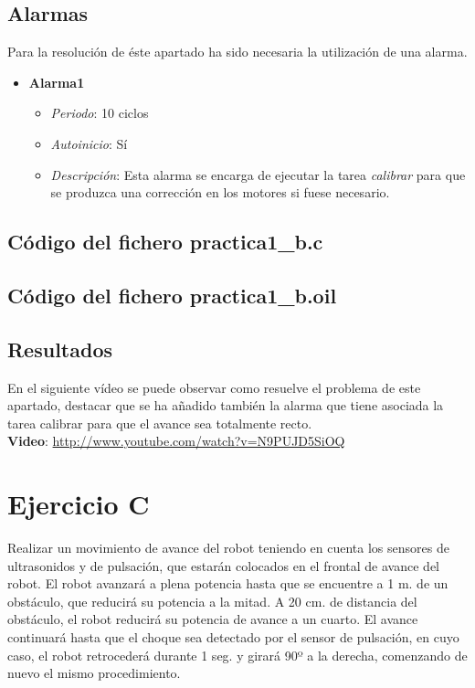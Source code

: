 \subsection{Alarmas}
Para la resolución de éste apartado ha sido necesaria la utilización de una alarma.

\begin{itemize}
	\item \textbf{Alarma1}
		\begin{itemize}
			\item \textit{Periodo}: 10 ciclos
			\item \textit{Autoinicio}: Sí
			\item \textit{Descripción}: Esta alarma se encarga de ejecutar la tarea \textit{calibrar} para que se produzca una corrección en los motores si fuese necesario.
		\end{itemize}
			
\end{itemize}

\subsection{Código del fichero practica1\_b.c}


\subsection{Código del fichero practica1\_b.oil}


\subsection{Resultados}
En el siguiente vídeo se puede observar como resuelve el problema de este apartado, destacar que se ha añadido también la alarma que tiene asociada la tarea calibrar para que el avance sea totalmente recto.\\

\textbf{Video}: \url{http://www.youtube.com/watch?v=N9PUJD5SiOQ}

\section{Ejercicio C}

\par Realizar un movimiento de avance del robot teniendo en cuenta los sensores de ultrasonidos y de pulsación, 
que estarán colocados en el frontal de avance del robot. El robot avanzará a plena potencia hasta que se encuentre 
a 1 m. de un obstáculo, que reducirá su potencia a la mitad. A 20 cm. de distancia del obstáculo, el robot reducirá 
su potencia de avance a un cuarto. El avance continuará hasta que el choque sea detectado por el sensor de pulsación, 
en cuyo caso, el robot retrocederá durante 1 seg. y girará 90º a la derecha, comenzando de nuevo el mismo procedimiento.


